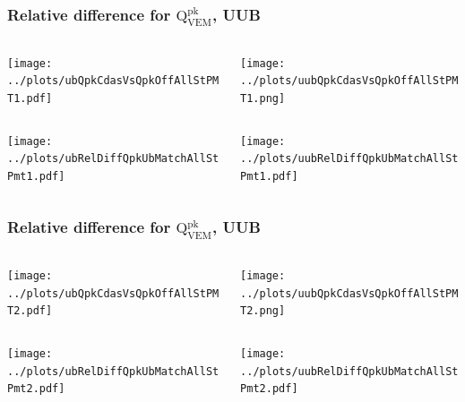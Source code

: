 \documentclass[aspectratio=169]{beamer}
\begin{document}
\begin{frame}
  \frametitle{Relative difference for
  $\mathrm{Q}^{\mathrm{pk}}_{\mathrm{VEM}}$, UUB}
  \begin{center}
    \begin{columns}
      \begin{column}{.5\textwidth}
        \texttt{[image: ../plots/ubQpkCdasVsQpkOffAllStPMT1.pdf]}
      \end{column}
      \begin{column}{.5\textwidth}
        \texttt{[image: ../plots/uubQpkCdasVsQpkOffAllStPMT1.png]}
      \end{column}
    \end{columns}
    \begin{columns}
      \begin{column}{.5\textwidth}
        \texttt{[image: ../plots/ubRelDiffQpkUbMatchAllStPmt1.pdf]}
      \end{column}
      \begin{column}{.5\textwidth}
        \texttt{[image: ../plots/uubRelDiffQpkUbMatchAllStPmt1.pdf]}
      \end{column}
    \end{columns}
  \end{center}
\end{frame}

\begin{frame}
  \frametitle{Relative difference for
  $\mathrm{Q}^{\mathrm{pk}}_{\mathrm{VEM}}$, UUB}
  \begin{center}
    \begin{columns}
      \begin{column}{.5\textwidth}
        \texttt{[image: ../plots/ubQpkCdasVsQpkOffAllStPMT2.pdf]}
      \end{column}
      \begin{column}{.5\textwidth}
        \texttt{[image: ../plots/uubQpkCdasVsQpkOffAllStPMT2.png]}
      \end{column}
    \end{columns}
    \begin{columns}
      \begin{column}{.5\textwidth}
        \texttt{[image: ../plots/ubRelDiffQpkUbMatchAllStPmt2.pdf]}
      \end{column}
      \begin{column}{.5\textwidth}
        \texttt{[image: ../plots/uubRelDiffQpkUbMatchAllStPmt2.pdf]}
      \end{column}
    \end{columns}
  \end{center}
\end{frame}
\end{document}
